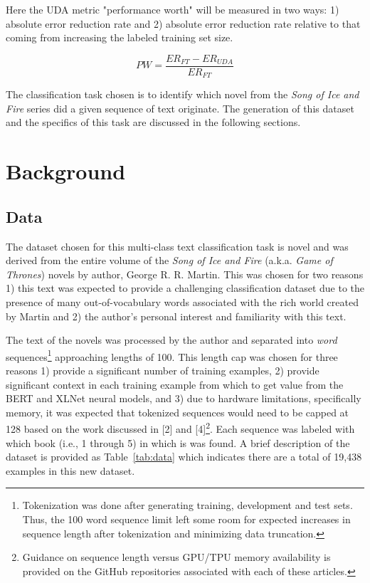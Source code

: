 \documentclass[twoside,twocolumn,10pt]{article}
\begin{document}
Here the UDA metric "performance worth" will be measured in two ways: 1) absolute error reduction rate and 2) absolute error reduction rate relative to that coming from increasing the labeled training set size.

\begin{equation}
\label{eq:perfmet}
PW = \frac{ER_{FT} - ER_{UDA}}{ER_{FT}}
\end{equation}

The classification task chosen is to identify which novel from the {\it Song of Ice and Fire} series did a given sequence of text originate. The generation of this dataset and the specifics of this task are discussed in the following sections.




\section{Background} \label{background}

\subsection{Data} \label{data}
The dataset chosen for this multi-class text classification task is novel and was derived from the entire volume of the {\it Song of Ice and Fire} (a.k.a. {\it Game of Thrones}) novels by author, George R. R. Martin. This was chosen for two reasons 1) this text was expected to provide a challenging classification dataset due to the presence of many out-of-vocabulary words associated with the rich world created by Martin and 2) the author's personal interest and familiarity with this text.

The text of the novels was processed by the author and separated into {\it word} sequences\footnote{Tokenization was done after generating training, development and test sets. Thus, the 100 word sequence limit left some room for expected increases in sequence length after tokenization and minimizing data truncation.} approaching lengths of 100. This length cap was chosen for three reasons 1) provide a significant number of training examples, 2) provide significant context in each training example from which to get value from the BERT and XLNet neural models, and 3) due to hardware limitations, specifically memory, it was expected that tokenized sequences would need to be capped at 128 based on the work discussed in [2] and [4]\footnote{Guidance on sequence length versus GPU/TPU memory availability is provided on the GitHub repositories associated with each of these articles.}. Each sequence was labeled with which book (i.e., 1 through 5) in which is was found. A brief description of the dataset is provided as Table~\ref{tab:data} which indicates there are a total of 19,438 examples in this new dataset.
\end{document}
